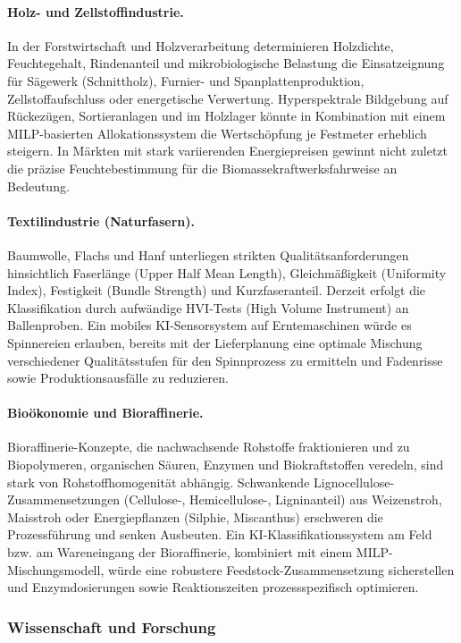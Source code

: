\documentclass[a4paper, 12pt, twoside, openright]{report}
\theoremstyle{definition}
\theoremstyle{definition}
\begin{document}
\paragraph{Holz- und Zellstoffindustrie.}
In der Forstwirtschaft und Holzverarbeitung determinieren Holzdichte,
Feuchtegehalt, Rindenanteil und mikrobiologische Belastung die
Einsatzeignung für Sägewerk (Schnittholz), Furnier- und
Spanplattenproduktion, Zellstoffaufschluss oder energetische Verwertung.
Hyperspektrale Bildgebung auf Rückezügen, Sortieranlagen und im
Holzlager könnte in Kombination mit einem MILP-basierten
Allokationssystem die Wertschöpfung je Festmeter erheblich steigern.
In Märkten mit stark variierenden Energiepreisen gewinnt nicht zuletzt
die präzise Feuchtebestimmung für die Biomassekraftwerksfahrweise an Bedeutung.

\paragraph{Textilindustrie (Naturfasern).}
Baumwolle, Flachs und Hanf unterliegen strikten Qualitätsanforderungen
hinsichtlich Faserlänge (Upper Half Mean Length), Gleichmäßigkeit
(Uniformity Index), Festigkeit (Bundle Strength) und Kurzfaseranteil.
Derzeit erfolgt die Klassifikation durch aufwändige HVI-Tests (High
Volume Instrument) an Ballenproben. Ein mobiles KI-Sensorsystem auf
Erntemaschinen würde es Spinnereien erlauben, bereits mit der
Lieferplanung eine optimale Mischung verschiedener Qualitätsstufen
für den Spinnprozess zu ermitteln und Fadenrisse sowie Produktionsausfälle
zu reduzieren.

\paragraph{Bioökonomie und Bioraffinerie.}
Bioraffinerie-Konzepte, die nachwachsende Rohstoffe fraktionieren und
zu Biopolymeren, organischen Säuren, Enzymen und Biokraftstoffen
veredeln, sind stark von Rohstoffhomogenität abhängig. Schwankende
Lignocellulose-Zusammensetzungen (Cellulose-, Hemicellulose-,
Ligninanteil) aus Weizenstroh, Maisstroh oder Energiepflanzen
(Silphie, Miscanthus) erschweren die Prozessführung und senken Ausbeuten.
Ein KI-Klassifikationssystem am Feld bzw. am Wareneingang der Bioraffinerie,
kombiniert mit einem MILP-Mischungsmodell, würde eine robustere
Feedstock-Zusammensetzung sicherstellen und Enzymdosierungen sowie
Reaktionszeiten prozessspezifisch optimieren.

\subsubsection{Wissenschaft und Forschung}
\end{document}
